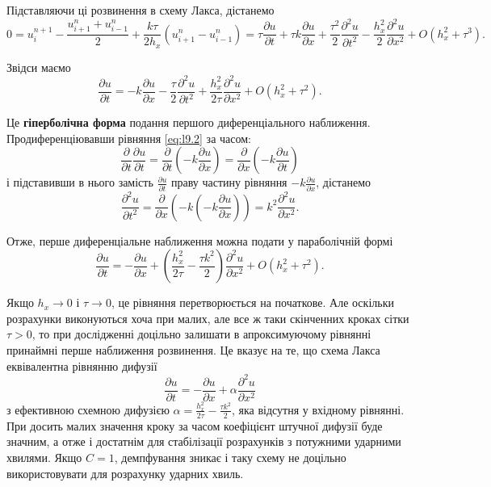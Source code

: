 Підставляючи ці розвинення в схему Лакса, дістанемо
\begin{equation*}
    0 = u_i^{n+1}-\frac{u_{i+1}^n+u_{i-1}^n}{2}+\frac{k\tau}{2h_x}(u_{i+1}^n-u_{i-1}^n)=\tau\frac{\partial u}{\partial t}+\tau k\frac{\partial u}{\partial x}+\frac{\tau^2}{2}\frac{\partial^2 u}{\partial t^2}-\frac{h_x^2}{2}\frac{\partial^2 u}{\partial x^2}+O(h_x^2+\tau^3).
\end{equation*}

Звідси маємо 
\begin{equation*}
    \frac{\partial u}{\partial t}=-k\frac{\partial u}{\partial x}-\frac{\tau}{2}\frac{\partial^2 u}{\partial t^2}+\frac{h_x^2}{2\tau}\frac{\partial^2 u}{\partial x^2}+O(h_x^2+\tau^2).
\end{equation*}

Це \textbf{гіперболічна форма} подання першого диференціального наближення. Продиференціювавши рівняння \eqref{eq:l9.2} за часом: 
\begin{equation*}
    \frac{\partial}{\partial t} \frac{\partial u}{\partial t} = \frac{\partial}{\partial t} \left(-k\frac{\partial u}{\partial x}\right)=\frac{\partial}{\partial x}\left(-k\frac{\partial u}{\partial t}\right)
\end{equation*} 
і підставивши в нього замість $\frac{\partial u}{\partial t}$ праву частину рівняння $-k\frac{\partial u}{\partial x}$, дістанемо
\begin{equation*}
    \frac{\partial^2 u}{\partial t^2} = \frac{\partial}{\partial x}\left(-k\left(-k\frac{\partial u}{\partial x}\right)\right) = k^2\frac{\partial^2 u}{\partial x^2}.
\end{equation*} 

Отже, перше диференціальне наближення можна подати у параболічній формі
\begin{equation*}
    \frac{\partial u}{\partial t}=-\frac{\partial u}{\partial x}+\left(\frac{h_x^2}{2\tau}-\frac{\tau k^2}{2}\right) \frac{\partial^2 u}{\partial x^2}+O(h_x^2+\tau^2).
\end{equation*}

Якщо $h_x \to 0$ і $\tau \to 0$, це рівняння перетворюється на початкове. Але оскільки розрахунки виконуються хоча при малих, але все ж таки скінченних кроках сітки $\tau > 0$, то при дослідженні доцільно залишати в апроксимуючому рівнянні принаймні перше наближення розвинення. Це вказує на те, що схема Лакса еквівалентна рівнянню дифузії
\begin{equation}
    \label{eq:l9.3}
    \frac{\partial u}{\partial t}=-\frac{\partial u}{\partial x}+\alpha\frac{\partial^2 u}{\partial x^2}
\end{equation}
з ефективною схемною дифузією $\alpha = \frac{h_x^2}{2\tau}-\frac{\tau k^2}{2}$, яка відсутня у вхідному рівнянні. При досить малих значення кроку за часом коефіцієнт штучної дифузії буде значним, а отже і достатнім для стабілізації розрахунків з потужними ударними хвилями. Якщо $C = 1$, демпфування зникає і таку схему не доцільно використовувати для розрахунку ударних хвиль. \medskip

